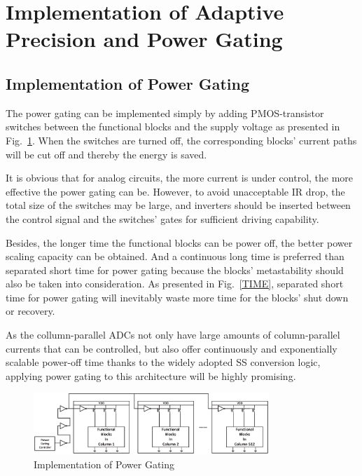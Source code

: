 \section{Implementation of Adaptive Precision and Power Gating}\label{strategy}

\subsection{Implementation of Power Gating}

The power gating can be implemented simply by adding PMOS-transistor switches between the functional blocks and the supply voltage \cite{keating_low_2007} as presented in Fig.~\ref{GATING}. 
When the switches are turned off, the corresponding blocks’ current paths will be cut off and thereby the energy is saved. 

It is obvious that for analog circuits, the more current is under control, the more effective the power gating can be. However, to avoid unacceptable IR drop, the total size of the switches may be large, 
and inverters should be inserted between the control signal and the switches’ gates for sufficient driving capability. 

Besides, the longer time the functional blocks can be power off, the better power scaling capacity can be obtained. And a continuous long time is preferred than separated short time for power gating because the blocks' metastability should also be taken into consideration.
As presented in Fig.~\ref{TIME}, separated short time for power gating will inevitably waste more
time for the blocks' shut down or recovery. 

As the collumn-parallel ADCs not only have large amounts of column-parallel currents that can be controlled, but also offer continuously and exponentially scalable power-off time thanks to the widely adopted SS conversion logic, applying power gating to this architecture will be highly promising.

\begin{figure}[htbp]
	\centerline{\includegraphics[width=3.5in]{./Figures/GATING.eps}}
	\caption{Implementation of Power Gating}
	\label{GATING}
\end{figure} 

